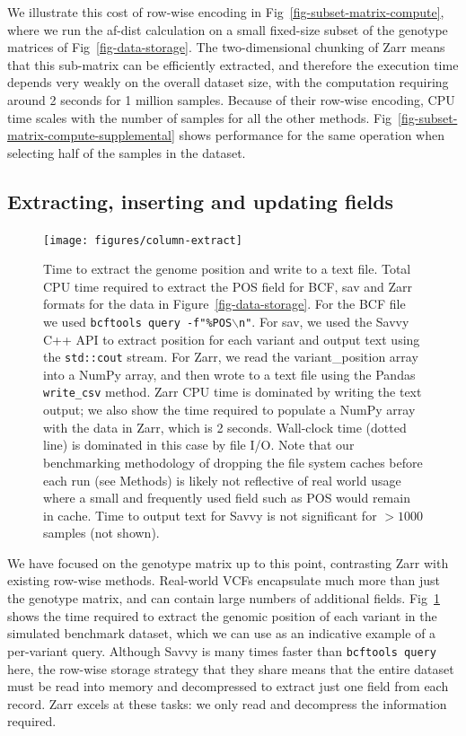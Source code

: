 \documentclass[a4paper,num-refs]{oup-contemporary}
\begin{document}
We illustrate this cost of row-wise encoding in
Fig~\ref{fig-subset-matrix-compute}, where we run the af-dist calculation
on a small fixed-size subset of the genotype matrices of
Fig~\ref{fig-data-storage}. The two-dimensional chunking of Zarr
means that this sub-matrix can be efficiently
extracted, and therefore the execution time depends very weakly on
the overall dataset size, with the computation requiring around
2 seconds for 1 million samples. Because of their
row-wise encoding, CPU time scales with the number of samples
for all the other methods.
Fig~\ref{fig-subset-matrix-compute-supplemental} shows performance
for the same operation when selecting half of the samples in the
dataset.

\subsection{Extracting, inserting and updating fields}
\begin{figure}
\texttt{[image: figures/column-extract]}
\caption{Time to extract the genome position and write to a text file.
Total CPU time required to extract the POS field for BCF,
sav and Zarr formats
for the data in Figure~\ref{fig-data-storage}.
For the BCF file we used \texttt{bcftools query -f"\%POS$\backslash$n"}.
For sav, we used the Savvy C++ API to extract position for each variant
and output text using the \texttt{std::cout} stream. For Zarr, we read
the variant\_position array into a NumPy array, and then wrote to
a text file using the Pandas \texttt{write\_csv} method.
Zarr CPU time is dominated by writing the text output; we also show
the time required to populate a NumPy array with the data in Zarr,
which is 2 seconds. Wall-clock time (dotted line) is dominated
in this case by file I/O. Note that our benchmarking methodology of
dropping the file system caches before each run (see Methods) is
likely not reflective of real world usage where a small and
frequently used field such as POS would remain in cache.
Time to output text for Savvy is not significant
for $> 1000$ samples (not shown).
\label{fig-column-extract}}
\end{figure}
We have focused on the genotype matrix up to this point, contrasting
Zarr with existing row-wise methods.
Real-world VCFs encapsulate much more than just the genotype
matrix, and can contain large numbers of additional fields.
Fig~\ref{fig-column-extract} shows the time required to extract
the genomic position of each variant in the simulated benchmark
dataset, which we can use as an indicative example of a per-variant
query. Although Savvy is many times faster than \texttt{bcftools query}
here, the row-wise storage strategy that they share means that
the entire dataset must be read into memory and
decompressed to extract just one field from each record. Zarr
excels at these tasks: we only read and decompress the information required.
\end{document}
